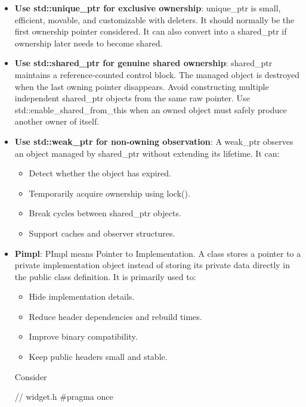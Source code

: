 \documentclass{report}
\begin{document}
\begin{itemize}
            Declaring some of these can prevent others from being generated. In particular, user-declared copy operations or a destructor can suppress implicit move operations.
            \bigbreak \noindent 
            Prefer the Rule of Zero: let resource-owning member types manage copying, moving, and destruction.
        \item \textbf{Use std::unique\_ptr for exclusive ownership}: unique\_ptr is small, efficient, movable, and customizable with deleters. It should normally be the first ownership pointer considered.
            \bigbreak \noindent 
            It can also convert into a shared\_ptr if ownership later needs to become shared.
        \item \textbf{Use std::shared\_ptr for genuine shared ownership}: shared\_ptr maintains a reference-counted control block. The managed object is destroyed when the last owning pointer disappears.
            \bigbreak \noindent 
            Avoid constructing multiple independent shared\_ptr objects from the same raw pointer. Use std::enable\_shared\_from\_this when an owned object must safely produce another owner of itself.
        \item \textbf{Use std::weak\_ptr for non-owning observation}: A weak\_ptr observes an object managed by shared\_ptr without extending its lifetime. It can:
            \begin{itemize}
                \item Detect whether the object has expired.
                \item Temporarily acquire ownership using lock().
                \item Break cycles between shared\_ptr objects.
                \item Support caches and observer structures.
            \end{itemize}
        \item \textbf{Pimpl}: PImpl means Pointer to Implementation. A class stores a pointer to a private implementation object instead of storing its private data directly in the public class definition.
            It is primarily used to:
            \begin{itemize}
                \item Hide implementation details.
                \item Reduce header dependencies and rebuild times.
                \item Improve binary compatibility.
                \item Keep public headers small and stable.
            \end{itemize}
            Consider
            \bigbreak \noindent 
            \begin{cppcode}
                // widget.h
                #pragma once


\end{cppcode}
\end{itemize}
\end{document}

